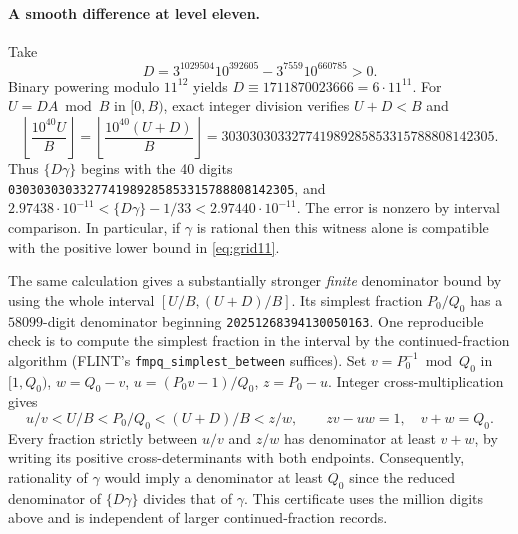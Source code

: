 \documentclass[11pt,a4paper]{article}
\theoremstyle{definition}\newtheorem{definition}[theorem]{Definition}\newtheorem{example}[theorem]{Example}
\theoremstyle{remark}\newtheorem{remark}[theorem]{Remark}
\begin{document}
\paragraph{A smooth difference at level eleven.}
Take
\[
 D=3^{1029504}10^{392605}-3^{7559}10^{660785}>0.
\]
Binary powering modulo $11^{12}$ yields $D\equiv1711870023666=6\cdot11^{11}$.
For $U=DA\bmod B$ in $[0,B)$, exact integer division verifies $U+D<B$ and
\[
 \left\lfloor\frac{10^{40}U}{B}\right\rfloor=
 \left\lfloor\frac{10^{40}(U+D)}{B}\right\rfloor
 =303030303327741989285853315788808142305.
\]
Thus $\{D\gamma\}$ begins with the 40 digits
\texttt{0303030303327741989285853315788808142305}, and
$2.97438\cdot10^{-11}<\{D\gamma\}-1/33<2.97440\cdot10^{-11}$.
The error is nonzero by interval comparison. In particular, if $\gamma$
is rational then this witness alone is compatible with the positive lower
bound in \eqref{eq:grid11}.

The same calculation gives a substantially stronger \emph{finite} denominator
bound by using the whole interval $[U/B,(U+D)/B]$. Its simplest fraction
$P_0/Q_0$ has a $58099$-digit denominator beginning
\texttt{20251268394130050163}. One reproducible check is to compute the
simplest fraction in the interval by the continued-fraction algorithm
(FLINT's \texttt{fmpq\_simplest\_between} suffices). Set
$v=P_0^{-1}\bmod Q_0$ in $[1,Q_0)$, $w=Q_0-v$,
$u=(P_0v-1)/Q_0$, $z=P_0-u$. Integer cross-multiplication gives
\[
 u/v<U/B<P_0/Q_0<(U+D)/B<z/w,
 \qquad zv-uw=1,\quad v+w=Q_0 .
\]
Every fraction strictly between $u/v$ and $z/w$ has denominator at least
$v+w$, by writing its positive cross-determinants with both endpoints.
Consequently, rationality of $\gamma$ would imply a denominator at least
$Q_0$ since the reduced denominator of $\{D\gamma\}$ divides that of
$\gamma$. This certificate uses the million digits above and is independent
of larger continued-fraction records.
\end{document}
